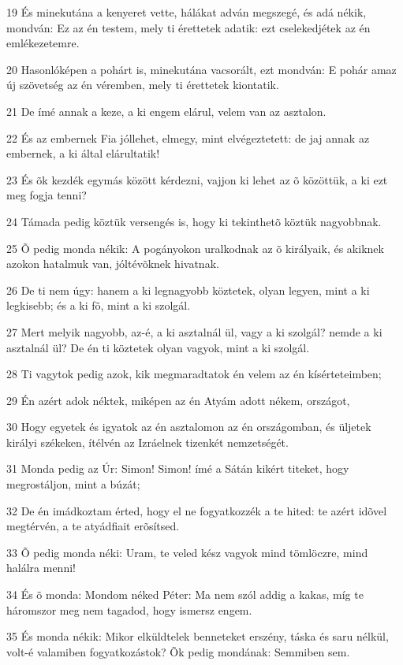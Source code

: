 \par 19 És minekutána a kenyeret vette, hálákat adván megszegé, és adá nékik, mondván: Ez az én testem, mely ti érettetek adatik: ezt cselekedjétek az én emlékezetemre.
\par 20 Hasonlóképen a pohárt is, minekutána vacsorált, ezt mondván: E pohár amaz új szövetség az én véremben, mely ti érettetek kiontatik.
\par 21 De ímé annak a keze, a ki engem elárul, velem van az asztalon.
\par 22 És az embernek Fia jóllehet, elmegy, mint  elvégeztetett: de jaj annak az embernek, a ki által elárultatik!
\par 23 És õk kezdék egymás között kérdezni, vajjon ki lehet az õ közöttük, a ki ezt meg fogja tenni?
\par 24 Támada pedig köztük versengés is, hogy ki tekinthetõ köztük nagyobbnak.
\par 25 Õ pedig monda nékik: A pogányokon uralkodnak az õ királyaik, és akiknek azokon hatalmuk van, jóltévõknek hivatnak.
\par 26 De ti nem úgy: hanem a ki legnagyobb köztetek, olyan legyen, mint a ki legkisebb; és a ki fõ, mint a ki szolgál.
\par 27 Mert melyik nagyobb, az-é, a ki asztalnál ül, vagy a ki szolgál? nemde a ki asztalnál ül? De én ti köztetek olyan vagyok, mint a ki szolgál.
\par 28 Ti vagytok pedig azok, kik megmaradtatok én velem az én kísérteteimben;
\par 29 Én azért adok néktek, miképen az én Atyám adott nékem, országot,
\par 30 Hogy egyetek és igyatok az én asztalomon az én országomban, és üljetek királyi székeken, ítélvén az Izráelnek tizenkét nemzetségét.
\par 31 Monda pedig az Úr: Simon! Simon! ímé a Sátán kikért titeket, hogy megrostáljon, mint a búzát;
\par 32 De én imádkoztam érted, hogy el ne fogyatkozzék a te hited: te azért idõvel megtérvén, a te atyádfiait erõsítsed.
\par 33 Õ pedig monda néki: Uram, te veled kész vagyok mind tömlöczre, mind halálra menni!
\par 34 És õ monda: Mondom néked Péter: Ma nem szól addig a kakas, míg te háromszor meg nem tagadod, hogy ismersz engem.
\par 35 És monda nékik: Mikor elküldtelek benneteket erszény, táska és saru nélkül, volt-é valamiben fogyatkozástok? Õk pedig mondának: Semmiben sem.
